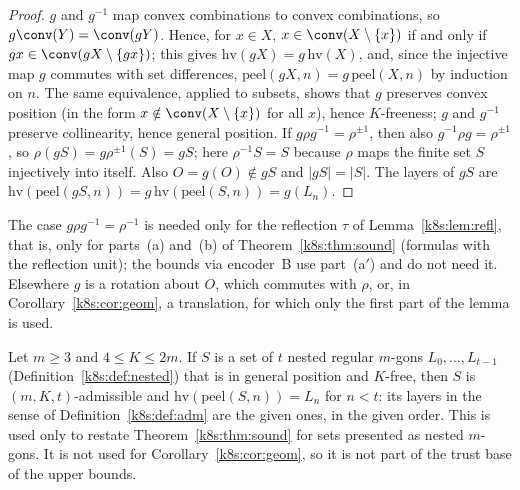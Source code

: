 \begin{proof}
$g$ and $g^{-1}$ map convex combinations to convex combinations, so $g\conv(Y)=\conv(gY)$. Hence, for $x\in X$,
$x\in\conv(X\setminus\{x\})$ if and only if $gx\in\conv(gX\setminus\{gx\})$; this gives $\mathrm{hv}(gX)=g\,\mathrm{hv}(X)$,
and, since the injective map $g$ commutes with set differences, $\mathrm{peel}(gX,n)=g\,\mathrm{peel}(X,n)$ by induction
on $n$. The same equivalence, applied to subsets, shows that $g$ preserves convex position (in the form
$x\notin\conv(X\setminus\{x\})$ for all $x$), hence $K$-freeness; $g$ and $g^{-1}$ preserve collinearity, hence general
position. If $g\rho g^{-1}=\rho^{\pm1}$, then also $g^{-1}\rho g=\rho^{\pm1}$, so $\rho(gS)=g\rho^{\pm1}(S)=gS$; here
$\rho^{-1}S=S$ because $\rho$ maps the finite set $S$ injectively into itself. Also $O=g(O)\notin gS$ and $|gS|=|S|$.
The layers of $gS$ are $\mathrm{hv}(\mathrm{peel}(gS,n))=g\,\mathrm{hv}(\mathrm{peel}(S,n))=g(L_n)$.
\end{proof}

The case $g\rho g^{-1}=\rho^{-1}$ is needed only for the reflection $\tau$ of Lemma~\ref{k8s:lem:refl}, that is, only
for parts~(a) and~(b) of Theorem~\ref{k8s:thm:sound} (formulas with the reflection unit); the bounds via encoder~B use
part~(a$'$) and do not need it. Elsewhere $g$ is a rotation about $O$, which commutes with $\rho$, or, in
Corollary~\ref{k8s:cor:geom}, a translation, for which only the first part of the lemma is used.

\begin{remark}\label{k8s:rem:ident}
Let $m\ge3$ and $4\le K\le2m$. If $S$ is a set of $t$ nested regular $m$-gons $L_0,\dots,L_{t-1}$
(Definition~\ref{k8s:def:nested}) that is in general position and $K$-free, then $S$ is $(m,K,t)$-admissible and
$\mathrm{hv}(\mathrm{peel}(S,n))=L_n$ for $n<t$: its layers in the sense of Definition~\ref{k8s:def:adm} are the given
ones, in the given order. This is used only to restate Theorem~\ref{k8s:thm:sound} for sets presented as nested
$m$-gons. It is not used for Corollary~\ref{k8s:cor:geom}, so it is not part of the trust base of the upper bounds.
\end{remark}

